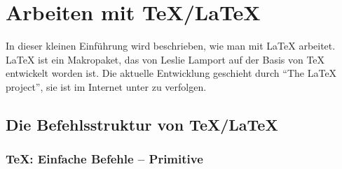 \chapter{Arbeiten mit \TeX/\LaTeX}%
\label{chap:TeX}                  %

In dieser kleinen Einführung wird beschrieben, wie man mit \LaTeX{} arbeitet.
\LaTeX{} ist ein Makropaket, das von Leslie Lamport auf der Basis 
von \TeX{} \cite{knuth_86:tex_book} entwickelt worden ist. Die aktuelle
Entwicklung geschieht durch "`The \LaTeX{} project"', sie ist im Internet
unter zu verfolgen.

\section[Die Befehlsstruktur]{Die Befehlsstruktur von \TeX/\LaTeX}%
\label{sec:befehlsstruktur}

\subsection{\TeX: Einfache Befehle -- Primitive} %


